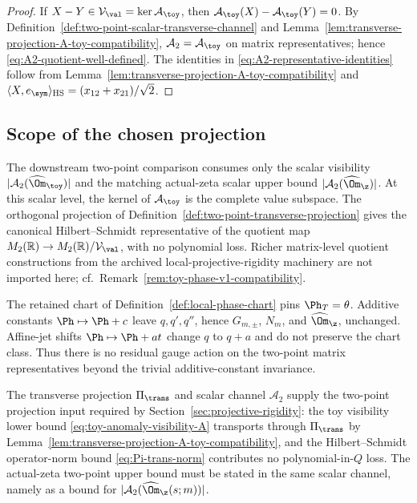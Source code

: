\begin{proof}
If \(X-Y\in\mathcal V_\val=\ker\mathcal A_\toy\), then
\(\mathcal A_\toy(X)-\mathcal A_\toy(Y)=0\).  By
Definition~\ref{def:two-point-scalar-transverse-channel} and
Lemma~\ref{lem:transverse-projection-A-toy-compatibility},
\(\mathcal A_2=\mathcal A_\toy\) on matrix representatives; hence
\eqref{eq:A2-quotient-well-defined}.  The identities in
\eqref{eq:A2-representative-identities} follow from
Lemma~\ref{lem:transverse-projection-A-toy-compatibility} and
\(\langle X,e_\sym\rangle_{\mathrm{HS}}=(x_{12}+x_{21})/\sqrt2\).
\end{proof}

\subsection{Scope of the chosen projection}
\label{subsec:transverse-projection-scope}

\begin{remark}
\label{rem:transverse-projection-no-richer-quotient}
The downstream two-point comparison consumes only the scalar
visibility \(|\mathcal A_2(\widehat\Om_\toy)|\) and the matching
actual-zeta scalar upper bound
\(|\mathcal A_2(\widehat\Om_\z)|\).  At this scalar level, the kernel
of \(\mathcal A_\toy\) is the complete value subspace.  The
orthogonal projection of
Definition~\ref{def:two-point-transverse-projection} gives the canonical
Hilbert--Schmidt representative of the quotient map
\(M_2(\mathbb R)\to M_2(\mathbb R)/\mathcal V_\val\), with no
polynomial loss.  Richer matrix-level quotient constructions from the
archived local-projective-rigidity machinery are not imported here;
cf.\ Remark~\ref{rem:toy-phase-v1-compatibility}.
\end{remark}

\begin{remark}
\label{rem:transverse-projection-residual-gauge}
The retained chart of Definition~\ref{def:local-phase-chart} pins
\(\Ph_T=\theta\).  Additive constants \(\Ph\mapsto\Ph+c\) leave
\(q,q',q''\), hence \(G_{m,\pm}\), \(N_m\), and \(\widehat\Om_\z\),
unchanged.  Affine-jet shifts \(\Ph\mapsto\Ph+at\) change \(q\) to
\(q+a\) and do not preserve the chart class.  Thus there is no
residual gauge action on the two-point matrix representatives beyond
the trivial additive-constant invariance.
\end{remark}

\begin{lemma}
\label{lem:transverse-projection-sufficient}
The transverse projection \(\Pi_\trans\) and scalar channel
\(\mathcal A_2\) supply the two-point projection input required by
Section~\ref{sec:projective-rigidity}: the toy visibility lower bound
\eqref{eq:toy-anomaly-visibility-A} transports through
\(\Pi_\trans\) by
Lemma~\ref{lem:transverse-projection-A-toy-compatibility}, and the
Hilbert--Schmidt operator-norm bound
\eqref{eq:Pi-trans-norm} contributes no polynomial-in-\(Q\) loss.
The actual-zeta two-point upper bound must be stated in the same
scalar channel, namely as a bound for
\(|\mathcal A_2(\widehat\Om_\z(s;m))|\).
\end{lemma}

